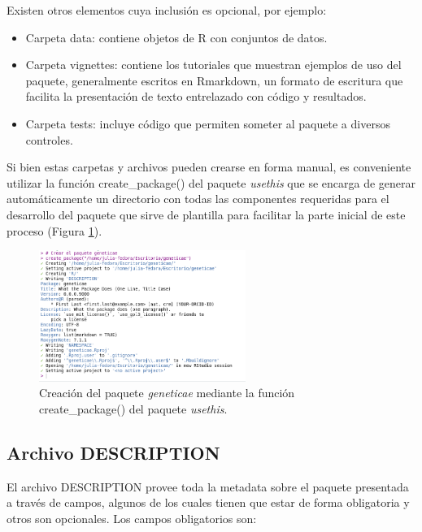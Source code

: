 Existen otros elementos cuya inclusión es opcional, por ejemplo:

\begin{itemize}
\item Carpeta data: contiene objetos de R con conjuntos de datos.
\item Carpeta vignettes: contiene los tutoriales que muestran ejemplos de uso del paquete, generalmente escritos en Rmarkdown, un formato de escritura que
facilita la presentación de texto entrelazado con código y resultados.
\item Carpeta tests: incluye código que permiten someter al paquete a diversos controles.
\end{itemize}

Si bien estas carpetas y archivos pueden crearse en forma manual, es conveniente utilizar la función \textcolor{fandango}{create\_package()} del paquete \emph{usethis} que se encarga de generar automáticamente un directorio con todas las componentes requeridas para el desarrollo del paquete que sirve de plantilla para facilitar la parte inicial de este proceso (Figura \ref{fig:fig32}). 

\begin{figure}[h]
	\begin{center}
		\includegraphics[width=0.60\textwidth]{./Graficos/creacion2.png}	
	\end{center}
	\caption{Creación del paquete \emph{geneticae} mediante la función \textcolor{fandango}{create\_package()} del paquete \emph{usethis}.}
	\label{fig:fig32}
\end{figure}


\subsection{Archivo DESCRIPTION}
\label{subsec:description}
El archivo DESCRIPTION provee toda la metadata sobre el paquete presentada a través de campos, algunos de los cuales tienen que estar de forma obligatoria y otros son opcionales. Los campos obligatorios son: 

